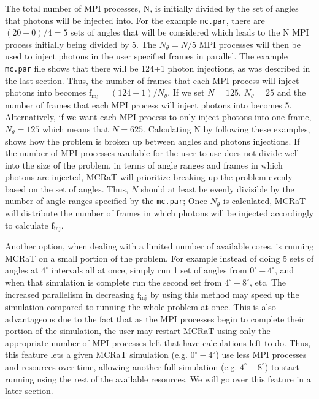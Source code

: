 \documentclass[12pt,a4paper]{article}
\begin{document}
 The total number of MPI processes, N, is initially divided by the set of angles that photons will be injected into. For the example \texttt{mc.par}, there are $(20-0)/4=5$ sets of angles that will be considered which leads to the N MPI process initially being divided by 5. The $N_\theta=N/5$ MPI processes will then be used to inject photons in the user specified frames in parallel. The example \texttt{mc.par} file shows that there will be 124+1 photon injections, as was described in the last section. Thus, the number of frames that each MPI process will inject photons into becomes $\mathrm{f_{inj}}=(124+1)/N_\theta$. If we set $N=125$, $N_\theta=25$ and the number of frames that each MPI process will inject photons into becomes 5. Alternatively, if we want each MPI process to only inject photons into one frame, $N_\theta=125$ which means that $N=625$. Calculating N by following these examples, shows how the problem is broken up between angles and photons injections. If the number of MPI processes available for the user to use does not divide well into the size of the problem, in terms of angle ranges and frames in which photons are injected, MCRaT will prioritize breaking up the problem evenly based on the set of angles. Thus, $N$ should at least be evenly divisible by the number of angle ranges specified by the \texttt{mc.par}; Once $N_\theta$ is calculated, MCRaT will distribute the number of frames in which photons will be injected accordingly to calculate $\mathrm{f_{inj}}$.
 
 Another option, when dealing with a limited number of available cores, is running MCRaT on a small portion of the problem. For example instead of doing 5 sets of angles at $4^\circ$ intervals all at once, simply run 1 set of angles from $0^\circ-4^\circ$, and when that simulation is complete run the second set from $4^\circ-8^\circ$, etc. The increased parallelism in decreasing $\mathrm{f_{inj}}$ by using this method may speed up the simulation compared to running the whole problem at once. This is also advantageous due to the fact that as the MPI processes begin to complete their portion of the simulation, the user may restart MCRaT using only the appropriate number of MPI processes left that have calculations left to do. Thus, this feature lets a given MCRaT simulation (e.g. $0^\circ-4^\circ$) use less MPI processes and resources over time, allowing another full simulation (e.g. $4^\circ-8^\circ$) to start running using the rest of the available resources. We will go over this feature in a later section.
 
\end{document}
